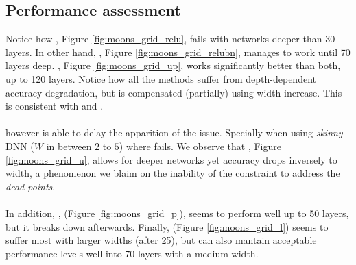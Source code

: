 \subsection{Performance assessment}\label{subsec:benchmarking}
Notice how \ReLU, Figure \ref{fig:moons_grid_relu}, fails with networks deeper than 30 layers. In other hand, \ReLUBN, Figure \ref{fig:moons_grid_relubn}, manages to work until 70 layers deep. \SepUnitPoint,  Figure \ref{fig:moons_grid_up}, works significantly better than both, up to 120 layers. Notice how all the methods suffer from depth-dependent accuracy degradation, but is compensated (partially) using width increase. This is consistent with \cite{simpnet} and \cite{densenet}. 
\\\\
\SepUnitPoint however is able to delay the apparition of the issue. Specially when using \emph{skinny} DNN ($W$ in between $2$ to $5$) where \ReLUBN fails. We observe that \SepUnit, Figure \ref{fig:moons_grid_u}, allows for deeper networks yet accuracy drops inversely to width, a phenomenon we blaim on the inability of the \SepUnit constraint to address the \emph{dead points}. 
\\\\
In addition, \SepPoint, (Figure \ref{fig:moons_grid_p}), seems to perform well up to 50 layers, but it breaks down afterwards. Finally, \SepLayer (Figure \ref{fig:moons_grid_l}) seems to suffer most with larger widths (after 25), but can also mantain acceptable performance levels well into 70 layers with a medium width.
